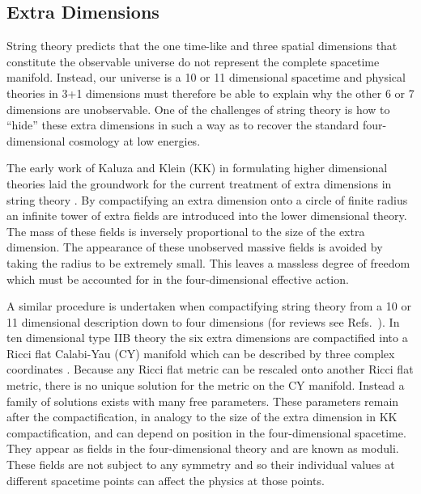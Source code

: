 \subsection{Extra Dimensions}
String theory predicts that the one time-like and three spatial dimensions that
constitute the observable universe do not represent the complete spacetime manifold.
Instead,
our universe is a 10 or
11 dimensional spacetime and physical theories in 3+1 dimensions must
therefore be able to explain why the 
other 6 or 7 dimensions are unobservable. One of the challenges of string
theory is how 
to ``hide'' these extra dimensions in such a way as to 
recover the standard four-dimensional cosmology at low energies.

The early work of Kaluza and Klein (KK) in formulating higher dimensional 
theories laid the groundwork for the current treatment of extra dimensions in
string theory \cite{Kaluza1921, Klein1926}. By
compactifying an extra dimension onto a circle of finite radius an infinite
tower of extra fields are introduced into the lower dimensional theory. The
mass of these fields is inversely proportional to the size of the extra
dimension. The appearance of these
unobserved massive fields is avoided by taking the radius to be extremely small.
This leaves a
massless degree of freedom which must be accounted for in the four-dimensional
effective action. 


A similar procedure is undertaken when compactifying string theory from a
10 or 11 dimensional description down to four dimensions (for reviews see
Refs.~\cite{douglas,grana}).
In ten dimensional type IIB theory the six extra dimensions are
compactified into a Ricci flat Calabi-Yau (CY) manifold which can be described
by three complex coordinates \cite{Yau1977}. 
Because any Ricci flat metric can be
rescaled onto another Ricci flat metric, there is no unique solution for the
metric on the CY manifold. Instead a family of solutions exists with many free
parameters. These parameters remain after the compactification, in
analogy to the size of the extra dimension in KK compactification, and can depend
on position in the four-dimensional spacetime. They appear as fields
in the four-dimensional theory and are known as moduli. 
These fields are not subject to any symmetry and so their individual values
at different spacetime points can affect the physics at those points.





